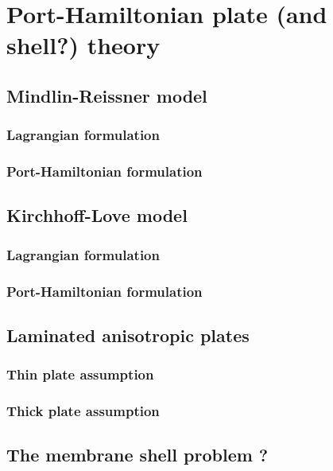 \chapter{Port-Hamiltonian plate (and shell?) theory}

\section{Mindlin-Reissner model}

\subsection{Lagrangian formulation}

\subsection{Port-Hamiltonian formulation}


\section{Kirchhoff-Love model}

\subsection{Lagrangian formulation}

\subsection{Port-Hamiltonian formulation}


\section{Laminated anisotropic plates}

\subsection{Thin plate assumption}

\subsection{Thick plate assumption}


\section{The membrane shell problem ?}